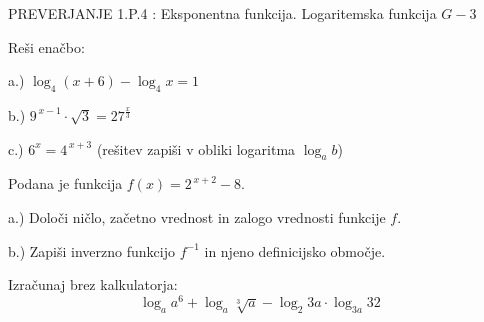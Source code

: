 \documentclass[a4paper,12pt]{letter}
\renewcommand{\headrulewidth}{3pt}
\renewcommand{\headrulewidth}{0.3pt}
\newcounter{tocke}
\begin{document}
\pagestyle{fancy}
\renewcommand\headrulewidth{0pt}
\lhead{}\chead{}\rhead{}
\rfoot{\vspace*{-2\baselineskip}}
\renewcommand{\vec}{\overrightarrow}
\everymath{\displaystyle}

\begin{minipage}{20cm}
\begin{bclogo}[couleur=brown!40,
  arrondi=0,ombre=true, couleurOmbre=gray!50,
logo =\bcplume,
  noborder=true]
{\textrm{{\Large{PREVERJANJE 1.P.4} \Huge{}:
\large{Eksponentna funkcija. Logaritemska funkcija} \hfill $G-3$}}}
\end{bclogo}
\end{minipage}
\begin{minipage}{20cm}
\end{minipage}


\def\tockeA{4+4+4}
\begin{naloga}[\hfill $\tockeA$] \addtocounter{tocke}{\numexpr\tockeA\relax}
Re\v{s}i ena\v{c}bo:

a.) $\log_4(x+6)-\log_4 x=1$

b.) $9^{\,x-1}\cdot\sqrt{3}=27^{\frac{x}{3}}$

c.) $6^{x}=4^{\,x+3}$ \quad (re\v{s}itev zapi\v{s}i v obliki logaritma $\log_a b$)
\end{naloga}\newpage

\def\tockeB{2+1+1+3}
\begin{naloga}[\hfill $\tockeB$] \addtocounter{tocke}{\numexpr\tockeB\relax}
Podana je funkcija $f(x)=2^{\,x+2}-8$.

a.) Dolo\v{c}i ni\v{c}lo, za\v{c}etno vrednost in zalogo vrednosti funkcije $f$.

b.) Zapi\v{s}i inverzno funkcijo $f^{-1}$ in njeno definicijsko obmo\v{c}je.
\end{naloga}\newpage

\def\tockeC{4}
\begin{naloga}[\hfill $\tockeC$] \addtocounter{tocke}{\numexpr\tockeC\relax}
Izra\v{c}unaj brez kalkulatorja:
$$\log_a a^6+\log_a \sqrt[3]{a}-\log_2 3a\cdot\log_{3a} 32$$
\end{naloga}\newpage
\end{document}
